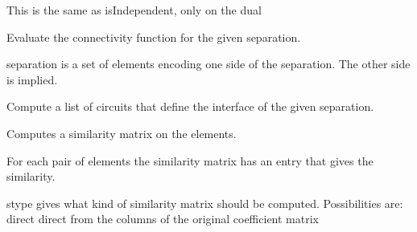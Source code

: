 \documentclass[letterpaper,12pt,english]{sphinxmanual}
\begin{document}
\begin{fulllineitems}
\begin{fulllineitems}
\sphinxAtStartPar
This is the same as isIndependent, only on the dual

\end{fulllineitems}


\begin{fulllineitems}
\label{\detokenize{api/modules:cbmpy.fluxmodules.matroid.Matroid.connectivity}}
\pysigstartsignatures
\pysiglinewithargsret
{}
{}
{}
\pysigstopsignatures
\sphinxAtStartPar
Evaluate the connectivity function for the given separation.

\sphinxAtStartPar
separation is a set of elements encoding one side of the separation. The other
side is implied.

\end{fulllineitems}


\begin{fulllineitems}
\label{\detokenize{api/modules:cbmpy.fluxmodules.matroid.Matroid.getInterface}}
\pysigstartsignatures
\pysiglinewithargsret
{}
{}
{}
\pysigstopsignatures
\sphinxAtStartPar
Compute a list of circuits that define the interface of the given
separation.

\end{fulllineitems}


\begin{fulllineitems}
\label{\detokenize{api/modules:cbmpy.fluxmodules.matroid.Matroid.similarityMatrix}}
\pysigstartsignatures
\pysiglinewithargsret
{}
{}
{}
\pysigstopsignatures
\sphinxAtStartPar
Computes a similarity matrix on the elements.

\sphinxAtStartPar
For each pair of elements the similarity matrix has an entry that
gives the similarity.

\sphinxAtStartPar
stype gives what kind of similarity matrix should be computed.
Possibilities are:
direct \sphinxhyphen{} direct from the columns of the original coefficient matrix
\begin{quote}


\end{quote}
\end{fulllineitems}
\end{fulllineitems}
\end{document}
